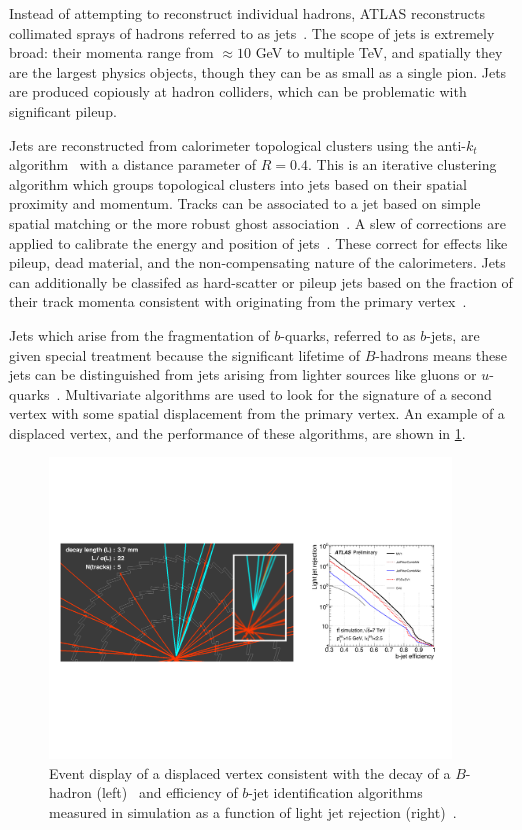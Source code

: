 Instead of attempting to reconstruct individual hadrons, ATLAS reconstructs collimated sprays of hadrons referred to as jets~\cite{PERF-2012-01}. The scope of jets is extremely broad: their momenta range from $\approx\!10$ GeV to multiple TeV, and spatially they are the largest physics objects, though they can be as small as a single pion. Jets are produced copiously at hadron colliders, which can be problematic with significant pileup.

Jets are reconstructed from calorimeter topological clusters using the anti-$k_t$ algorithm~\cite{2008.antikt} with a distance parameter of $R=0.4$. This is an iterative clustering algorithm which groups topological clusters into jets based on their spatial proximity and momentum. Tracks can be associated to a jet based on simple spatial matching or the more robust ghost association~\cite{ATLAS-CONF-2013-083}. A slew of corrections are applied to calibrate the energy and position of jets~\cite{PERF-2012-01,ATLAS-CONF-2013-083}. These correct for effects like pileup, dead material, and the non-compensating nature of the calorimeters. Jets can additionally be classifed as hard-scatter or pileup jets based on the fraction of their track momenta consistent with originating from the primary vertex~\cite{ATLAS-CONF-2014-018}.

Jets which arise from the fragmentation of $b$-quarks, referred to as $b$-jets, are given special treatment because the significant lifetime of $B$-hadrons means these jets can be distinguished from jets arising from lighter sources like gluons or $u$-quarks~\cite{ATLAS-CONF-2014-046}. Multivariate algorithms are used to look for the signature of a second vertex with some spatial displacement from the primary vertex. An example of a displaced vertex, and the performance of these algorithms, are shown in \cref{fig:objects-btag}.

\begin{figure}[tp]
  \centering
  \includegraphics[width=0.95\textwidth]{figures/performance/btag-ROC-display}
  \caption{Event display of a displaced vertex consistent with the decay of a $B$-hadron (left)~\cite{ATLAS-CONF-2010-004} and efficiency of $b$-jet identification algorithms measured in simulation as a function of light jet rejection (right)~\cite{ATLAS-CONF-2012-043}.}
  \label{fig:objects-btag}
\end{figure}

